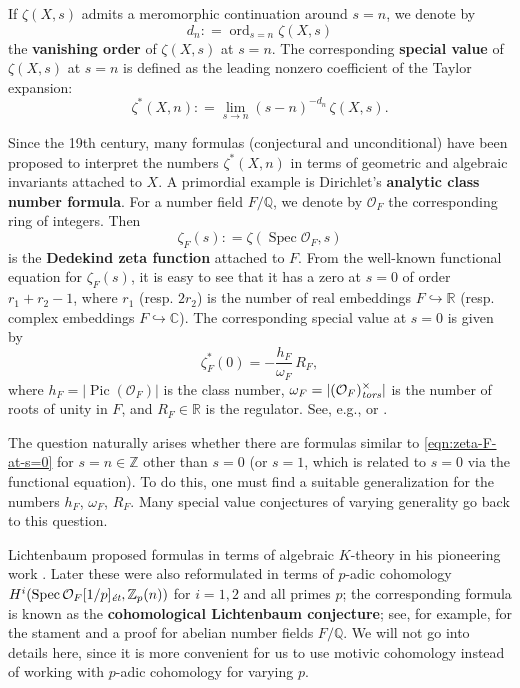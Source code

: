 \documentclass[draft]{article}
\DeclareMathOperator{\ord}{ord}
\DeclareMathOperator{\Pic}{Pic}
\DeclareMathOperator{\Spec}{Spec}
\newcommand{\CC}{\mathbb{C}}
\newcommand{\QQ}{\mathbb{Q}}
\newcommand{\RR}{\mathbb{R}}
\newcommand{\ZZ}{\mathbb{Z}}
\newcommand{\et}{\text{\it \'{e}t}}
\newcommand{\tors}{\text{\it tors}}
\newcommand{\dfn}{\mathrel{\mathop:}=}
\theoremstyle{myplain}
\theoremstyle{mydefinition}
\numberwithin{equation}{section}
\begin{document}
If $\zeta (X,s)$ admits a meromorphic continuation around $s = n$, we denote by
\begin{equation}
  \label{eqn:vanishing-order}
  d_n \dfn \ord_{s=n} \zeta (X,s)
\end{equation}
the \textbf{vanishing order} of $\zeta (X,s)$ at $s = n$. The corresponding
\textbf{special value} of $\zeta (X,s)$ at $s = n$ is defined as the leading
nonzero coefficient of the Taylor expansion:
$$\zeta^* (X,n) \dfn \lim_{s \to n} (s - n)^{-d_n}\,\zeta (X,s).$$

Since the 19th century, many formulas (conjectural and unconditional) have been
proposed to interpret the numbers $\zeta^* (X,n)$ in terms of geometric and
algebraic invariants attached to $X$. A primordial example is Dirichlet's
\textbf{analytic class number formula}. For a number field $F/\QQ$, we denote by
$\mathcal{O}_F$ the corresponding ring of integers. Then
$$\zeta_F (s) \dfn \zeta (\Spec \mathcal{O}_F, s)$$
is the \textbf{Dedekind zeta function} attached to $F$. From the well-known
functional equation for $\zeta_F (s)$, it is easy to see that it has a zero at
$s = 0$ of order $r_1 + r_2 - 1$, where $r_1$ (resp.  $2 r_2$) is the number of
real embeddings $F \hookrightarrow \RR$ (resp. complex embeddings
$F \hookrightarrow \CC$). The corresponding special value at $s = 0$ is given by
\begin{equation}
  \label{eqn:zeta-F-at-s=0}
  \zeta^*_F (0) = -\frac{h_F}{\omega_F}\,R_F,
\end{equation}
where $h_F = |\Pic (\mathcal{O}_F)|$ is the class number,
$\omega_F = |(\mathcal{O}_F)^\times_\tors|$ is the number of roots of unity in
$F$, and $R_F \in \RR$ is the regulator. See, e.g.,
\cite[Chapter~5, \S 1]{Borevich-Shafarevich} or \cite[\S VII.5]{Neukirch-1999}.

The question naturally arises whether there are formulas similar to
\eqref{eqn:zeta-F-at-s=0} for $s = n \in \ZZ$ other than $s = 0$ (or $s = 1$,
which is related to $s = 0$ via the functional equation). To do this, one must
find a suitable generalization for the numbers $h_F$, $\omega_F$, $R_F$.  Many
special value conjectures of varying generality go back to this question.

Lichtenbaum proposed formulas in terms of algebraic $K$-theory in his pioneering
work \cite{Lichtenbaum-1973}. Later these were also reformulated in terms of
$p$-adic cohomology $H^i (\Spec \mathcal{O}_F [1/p]_\et, \ZZ_p (n))$ for
$i = 1,2$ and all primes $p$; the corresponding formula is known as the
\textbf{cohomological Lichtenbaum conjecture}; see, for example,
\cite[\S 1.7]{Huber-Kings-2003} for the stament and a proof for abelian number
fields $F/\QQ$. We will not go into details here, since it is more convenient
for us to use motivic cohomology instead of working with $p$-adic cohomology for
varying $p$.
\end{document}
